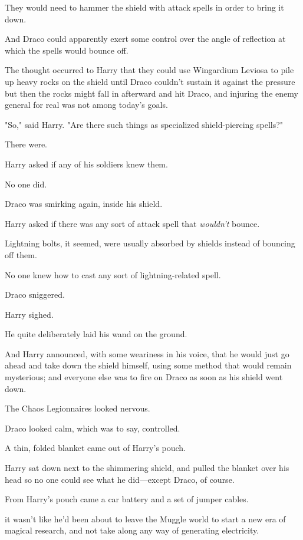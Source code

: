 They would need to hammer the shield with attack spells in order to bring it
down.

And Draco could apparently exert some control over the angle of reflection at
which the spells would bounce off.

The thought occurred to Harry that they could use Wingardium Leviosa to pile up
heavy rocks on the shield until Draco couldn't sustain it against the
pressure{\el} but then the rocks might fall in afterward and hit Draco, and
injuring the enemy general for real was not among today's goals.

"So," said Harry. "Are there such things as specialized shield-piercing spells?"

There were.

Harry asked if any of his soldiers knew them.

No one did.

Draco was smirking again, inside his shield.

Harry asked if there was any sort of attack spell that \emph{wouldn't} bounce.

Lightning bolts, it seemed, were usually absorbed by shields instead of
bouncing off them.

{\el} No one knew how to cast any sort of lightning-related spell.

Draco sniggered.

Harry sighed.

He quite deliberately laid his wand on the ground.

And Harry announced, with some weariness in his voice, that he would just go
ahead and take down the shield himself, using some method that would remain
mysterious; and everyone else was to fire on Draco as soon as his shield went
down.

The Chaos Legionnaires looked nervous.

Draco looked calm, which was to say, controlled.

A thin, folded blanket came out of Harry's pouch.

Harry sat down next to the shimmering shield, and pulled the blanket over his
head so no one could see what he did---except Draco, of course.

From Harry's pouch came a car battery and a set of jumper cables.

{\el} it wasn't like he'd been about to leave the Muggle world to start a new
era of magical research, and not take along any way of generating electricity.

